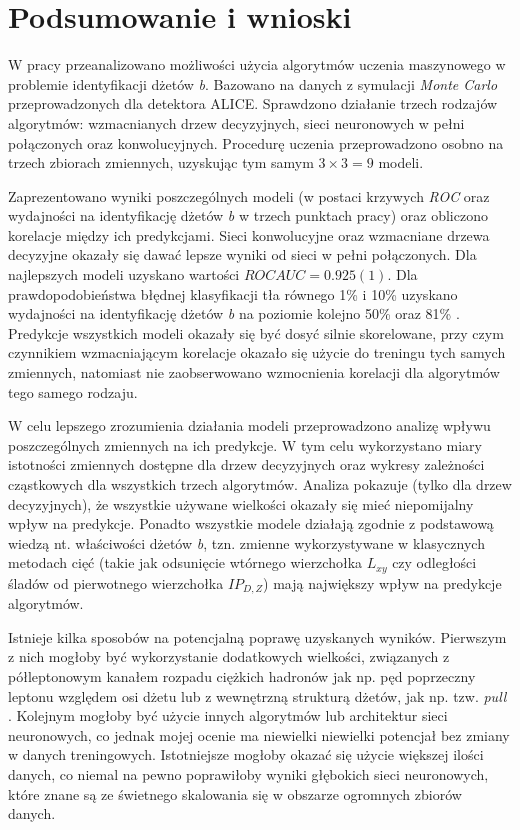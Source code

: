 \section{Podsumowanie i wnioski}
\label{sec:podsumowanie}

W pracy przeanalizowano możliwości użycia algorytmów uczenia maszynowego w problemie identyfikacji dżetów \textit{b}.
Bazowano na danych z symulacji \textit{Monte Carlo} przeprowadzonych dla detektora ALICE.
Sprawdzono działanie trzech rodzajów algorytmów: wzmacnianych drzew decyzyjnych, sieci neuronowych w pełni połączonych oraz konwolucyjnych.
Procedurę uczenia przeprowadzono osobno na trzech zbiorach zmiennych, uzyskując tym samym $3\times3=9$ modeli. 

Zaprezentowano wyniki poszczególnych modeli (w postaci krzywych \textit{ROC} oraz wydajności na identyfikację  dżetów \textit{b} w trzech punktach pracy) oraz obliczono korelacje między ich predykcjami.
Sieci konwolucyjne oraz wzmacniane drzewa decyzyjne okazały się dawać lepsze wyniki od sieci w pełni połączonych.
Dla najlepszych modeli uzyskano wartości $ROC AUC = 0.925(1)$.
Dla prawdopodobieństwa błędnej klasyfikacji tła równego 1\% i 10\% uzyskano wydajności na identyfikację dżetów \textit{b} na poziomie kolejno 50\% oraz 81\% .
Predykcje wszystkich modeli okazały się być dosyć silnie skorelowane, przy czym czynnikiem wzmacniającym korelacje okazało się użycie do treningu tych samych zmiennych, natomiast nie zaobserwowano wzmocnienia korelacji dla algorytmów tego samego rodzaju.

W celu lepszego zrozumienia działania modeli przeprowadzono analizę wpływu poszczególnych zmiennych na ich predykcje. W tym celu wykorzystano miary istotności zmiennych dostępne dla drzew decyzyjnych oraz wykresy zależności cząstkowych dla wszystkich trzech algorytmów.
Analiza pokazuje (tylko dla drzew decyzyjnych), że wszystkie używane wielkości okazały się mieć niepomijalny wpływ na predykcje.
Ponadto wszystkie modele działają zgodnie z podstawową wiedzą nt. właściwości dżetów \textit{b}, tzn. zmienne wykorzystywane w klasycznych metodach cięć (takie jak odsunięcie wtórnego wierzchołka $L_{xy}$ czy odległości śladów od pierwotnego wierzchołka $IP_{D,Z}$) mają największy wpływ na predykcje algorytmów. 

Istnieje kilka sposobów na potencjalną poprawę uzyskanych wyników. 
Pierwszym z nich mogłoby być wykorzystanie dodatkowych wielkości, związanych z półleptonowym kanałem rozpadu ciężkich hadronów jak np. pęd poprzeczny leptonu względem osi dżetu lub z wewnętrzną strukturą dżetów, jak np. tzw. \textit{pull} \cite{Gallicchio:2010sw}. 
Kolejnym mogłoby być użycie innych algorytmów lub architektur sieci neuronowych, co jednak mojej ocenie ma niewielki niewielki potencjał bez zmiany w danych treningowych.
Istotniejsze mogłoby okazać się użycie większej ilości danych, co niemal na pewno poprawiłoby wyniki głębokich sieci neuronowych, które znane są ze świetnego skalowania się w obszarze ogromnych zbiorów danych.

